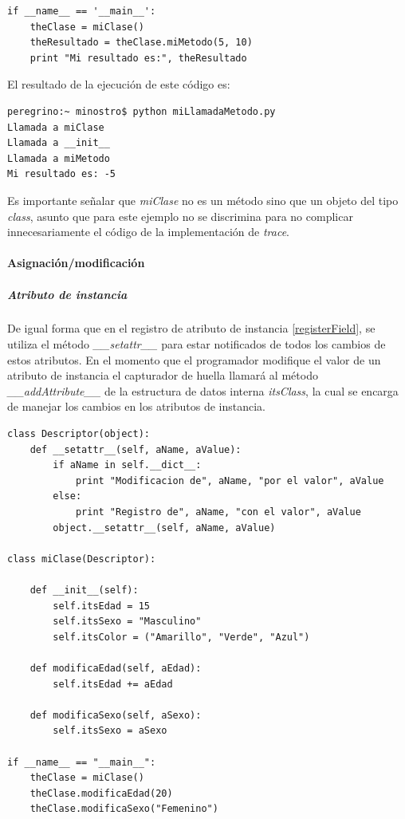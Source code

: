 \documentclass[12pt,legalpaper]{report}
\begin{document}
\begin{itemize}
\begin{singlespace}
\begin{lstlisting}[style=Python]
if __name__ == '__main__':
    theClase = miClase()
    theResultado = theClase.miMetodo(5, 10)
    print "Mi resultado es:", theResultado
\end{lstlisting}
\end{singlespace}

	
El resultado de la ejecución de este código es:

\begin{singlespace}
\begin{lstlisting}[style=consola,numbers=none]
peregrino:~ minostro$ python miLlamadaMetodo.py
Llamada a miClase
Llamada a __init__
Llamada a miMetodo
Mi resultado es: -5
\end{lstlisting}
\end{singlespace}

Es importante señalar que \textit{miClase} no es un método sino que un objeto del tipo \textit{class}, asunto que para este ejemplo no se discrimina para no complicar innecesariamente el código de la implementación de \textit{trace}.
	
\end{itemize}				
				
				\paragraph{Asignación/modificación}
					\subparagraph{Atributo de instancia}
					
De igual forma que en el registro de atributo de instancia \ref{registerField}, se utiliza el método \textit{\_\_setattr\_\_} para estar notificados de todos los cambios de estos atributos.  En el momento que el programador modifique el valor de un atributo de instancia el capturador de huella llamará al método \textit{\_\_addAttribute\_\_} de la estructura de datos interna \textit{itsClass}, la cual se encarga de manejar los cambios en los atributos de instancia.

\begin{singlespace}
\begin{lstlisting}[style=Python]
class Descriptor(object):
    def __setattr__(self, aName, aValue):
        if aName in self.__dict__:
            print "Modificacion de", aName, "por el valor", aValue
        else:
            print "Registro de", aName, "con el valor", aValue
        object.__setattr__(self, aName, aValue)

class miClase(Descriptor):
    
    def __init__(self):
        self.itsEdad = 15
        self.itsSexo = "Masculino"
        self.itsColor = ("Amarillo", "Verde", "Azul")
    
    def modificaEdad(self, aEdad):
        self.itsEdad += aEdad
    
    def modificaSexo(self, aSexo):
        self.itsSexo = aSexo

if __name__ == "__main__":
    theClase = miClase()
    theClase.modificaEdad(20)
    theClase.modificaSexo("Femenino")
\end{lstlisting}
\end{singlespace}
\end{document}
